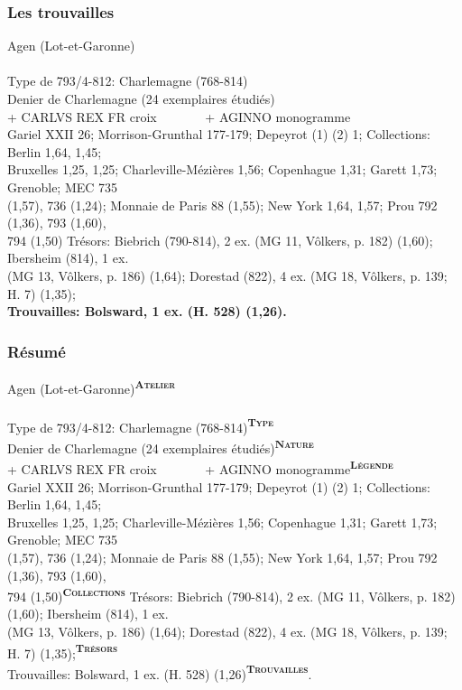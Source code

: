 \documentclass[10pt, compress]{beamer}
\newcommand{\up}[1]{\textsuperscript{\textbf{\textsc{#1}}}}
\begin{document}
\begin{frame}[fragile]
  \frametitle{Les trouvailles}
  \begin{scriptsize}
\textcolor{light_gray}{Agen (Lot-et-Garonne)}\\~\\

\textcolor{light_gray}{
Type de 793/4-812: Charlemagne (768-814)\\
Denier de Charlemagne (24 exemplaires étudiés)\\
+ CARLVS REX FR croix~~~~~~~ + AGINNO monogramme
}\\
\textcolor{light_gray}{
Gariel XXII 26; Morrison-Grunthal 177-179; Depeyrot (1) (2) 1;
Collections: Berlin 1,64, 1,45; \\
Bruxelles 1,25, 1,25; Charleville-Mézières 1,56; Copenhague 1,31; Garett 1,73; Grenoble; MEC 735 \\
(1,57), 736 (1,24); Monnaie de Paris 88 (1,55); New York 1,64, 1,57; Prou 792 (1,36), 793 (1,60), \\
794 (1,50) Trésors: Biebrich (790-814), 2 ex. (MG 11, Vôlkers, p. 182) (1,60); Ibersheim (814), 1 ex. \\
(MG 13, Vôlkers, p. 186) (1,64); Dorestad (822), 4 ex. (MG 18, Vôlkers, p. 139; H. 7) (1,35); }\\
\textbf{Trouvailles: Bolsward, 1 ex. (H. 528) (1,26).}
    \end{scriptsize}
\end{frame}

\begin{frame}[fragile]
  \frametitle{Résumé}
  \begin{scriptsize}
Agen (Lot-et-Garonne)\alert{\up{Atelier}}\\~\\
Type de 793/4-812: Charlemagne (768-814)\alert{\up{Type}}\\
Denier de Charlemagne (24 exemplaires étudiés)\alert{\up{Nature}}\\
+ CARLVS REX FR croix~~~~~~~ + AGINNO monogramme\alert{\up{Légende}}\\
Gariel XXII 26; Morrison-Grunthal 177-179; Depeyrot (1) (2) 1;
Collections: Berlin 1,64, 1,45; \\
Bruxelles 1,25, 1,25; Charleville-Mézières 1,56; Copenhague 1,31; Garett 1,73; Grenoble; MEC 735 \\
(1,57), 736 (1,24); Monnaie de Paris 88 (1,55); New York 1,64, 1,57; Prou 792 (1,36), 793 (1,60), \\
794 (1,50)\alert{\up{Collections}} Trésors: Biebrich (790-814), 2 ex. (MG 11, Vôlkers, p. 182) (1,60); Ibersheim (814), 1 ex. \\
(MG 13, Vôlkers, p. 186) (1,64); Dorestad (822), 4 ex. (MG 18, Vôlkers, p. 139; H. 7) (1,35);\alert{\up{Trésors}} \\
Trouvailles: Bolsward, 1 ex. (H. 528) (1,26)\alert{\up{Trouvailles}}.
    \end{scriptsize}
\end{frame}
\end{document}
